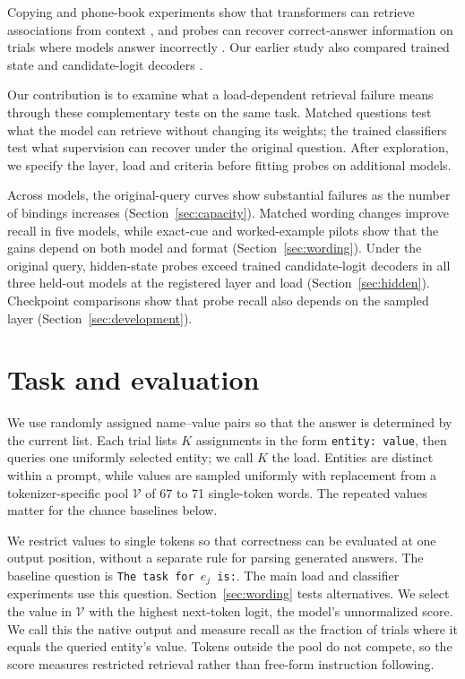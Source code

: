 \documentclass{article}
\begin{document}
Copying and phone-book experiments show that transformers can retrieve associations from context \citep{jelassi2024}, and probes can recover correct-answer information on trials where models answer incorrectly \citep{orgad2024,karim2026}.
Our earlier study also compared trained state and candidate-logit decoders \citep{decodable2609}.

Our contribution is to examine what a load-dependent retrieval failure means through these complementary tests on the same task.
Matched questions test what the model can retrieve without changing its weights; the trained classifiers test what supervision can recover under the original question.
After exploration, we specify the layer, load and criteria before fitting probes on additional models.

Across \NewNModels{} models, the original-query curves show substantial failures as the number of bindings increases (Section~\ref{sec:capacity}).
Matched wording changes improve recall in five models, while exact-cue and worked-example pilots show that the gains depend on both model and format (Section~\ref{sec:wording}).
Under the original query, hidden-state probes exceed trained candidate-logit decoders in all three held-out models at the registered layer and load (Section~\ref{sec:hidden}).
Checkpoint comparisons show that probe recall also depends on the sampled layer (Section~\ref{sec:development}).

\section{Task and evaluation}\label{sec:setup}
We use randomly assigned name--value pairs so that the answer is determined by the current list.
Each trial lists $K$ assignments in the form \texttt{entity: value}, then queries one uniformly selected entity; we call $K$ the load.
Entities are distinct within a prompt, while values are sampled uniformly with replacement from a tokenizer-specific pool $\mathcal V$ of 67 to 71 single-token words.
The repeated values matter for the chance baselines below.

We restrict values to single tokens so that correctness can be evaluated at one output position, without a separate rule for parsing generated answers.
The baseline question is \texttt{The task for $e_j$ is:}.
The main load and classifier experiments use this question.
Section~\ref{sec:wording} tests alternatives.
We select the value in $\mathcal V$ with the highest next-token logit, the model's unnormalized score.
We call this the native output and measure recall as the fraction of trials where it equals the queried entity's value.
Tokens outside the pool do not compete, so the score measures restricted retrieval rather than free-form instruction following.
\end{document}
